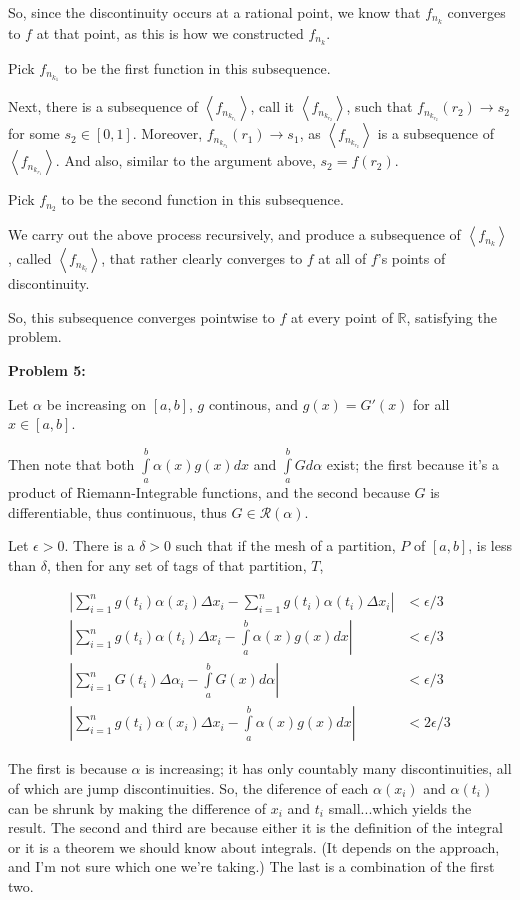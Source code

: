 \documentclass[a4paper,12pt]{article}
\newcommand{\tab}{\hspace{4mm}} %
\newcommand{\shunt}{\vspace{20mm}}
\newcommand{\absval}[1]{\left\lvert #1 \right\rvert}
\newcommand{\anbrack}[1]{\left\langle #1 \right\rangle}
\newcommand{\al}{\alpha} %
\newcommand{\de}{\delta}
\newcommand{\ep}{\epsilon}
\newcommand{\R}{\mathbb{R}}
\newcommand{\scrR}{\mathcal{R}}
\begin{document}
\tab \tab So, since the discontinuity occurs at a rational point, we know that $f_{n_k}$ converges to $f$ at that point, as this is how we constructed $f_{n_k}$.

\tab Pick $f_{n_{k_1}}$ to be the first function in this subsequence.

\tab Next, there is a subsequence of $\anbrack{f_{n_{k_{r_1}}}}$, call it $\anbrack{f_{n_{k_{r_2}}}}$, such that $f_{n_{k_{r_2}}}(r_2) \to s_2$ for some $s_2 \in [0,1]$. Moreover, $f_{n_{k_{r_2}}}(r_1) \to s_1$, as $\anbrack{f_{n_{k_{r_2}}}}$ is a subsequence of $\anbrack{f_{n_{k_{r_1}}}}$. And also, similar to the argument above, $s_2 = f(r_2)$.

\tab Pick $f_{n_2}$ to be the second function in this subsequence.

\tab We carry out the above process recursively, and produce a subsequence of $\anbrack{f_{n_k}}$, called $\anbrack{f_{n_{k_l}}}$, that rather clearly converges to $f$ at all of $f$'s points of discontinuity.

So, this subsequence converges pointwise to $f$ at every point of $\R$, satisfying the problem. 

\shunt

{\bf Problem 5:}

Let $\al$ be increasing on $[a,b]$, $g$ continous, and $g(x) = G'(x)$ for all $x \in [a,b]$.

Then note that both $\int\limits_a^b \al(x)g(x)dx$ and $\int\limits_a^b Gd\al$ exist; the first because it's a product of Riemann-Integrable functions, and the second because $G$ is differentiable, thus continuous, thus $G \in \scrR(\al)$.

Let $\ep >0$. There is a $\de >0$ such that if the mesh of a partition, $P$ of $[a,b]$, is less than $\de$, then for any set of tags of that partition, $T$,

\begin{align*}
\absval{\sum\limits_{i=1}^n g(t_i)\al(x_i) \Delta x_i - \sum\limits_{i=1}^n g(t_i)\al(t_i) \Delta x_i} &< \ep/3 \\
\absval{\sum\limits_{i=1}^n g(t_i)\al(t_i) \Delta x_i - \int\limits_a^b \al(x)g(x)dx} &< \ep/3 \\
\absval{\sum\limits_{i=1}^n G(t_i)\Delta \al_i - \int\limits_a^b G(x)d\al} &< \ep/3 \\
\absval{\sum\limits_{i=1}^n g(t_i)\al(x_i) \Delta x_i - \int\limits_a^b \al(x)g(x)dx} &< 2\ep/3
\end{align*}

The first is because $\al$ is increasing; it has only countably many discontinuities, all of which are jump discontinuities. So, the diference of each $\al(x_i)$ and $\al(t_i)$ can be shrunk by making the difference of $x_i$ and $t_i$ small...which yields the result. The second and third are because either it is the definition of the integral or it is a theorem we should know about integrals. (It depends on the approach, and I'm not sure which one we're taking.) The last is a combination of the first two.
\end{document}
